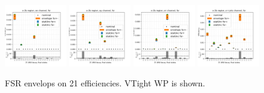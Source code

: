 \begin{figure}
    \includegraphics[width=0.24\textwidth]{chapters/Appendix/sectionTTSyst/figures/afterCorr/icata3_ch0_fsr.png}
    \includegraphics[width=0.24\textwidth]{chapters/Appendix/sectionTTSyst/figures/afterCorr/icata3_ch1_fsr.png}
    \includegraphics[width=0.24\textwidth]{chapters/Appendix/sectionTTSyst/figures/afterCorr/icata3_ch2_fsr.png}
    \includegraphics[width=0.24\textwidth]{chapters/Appendix/sectionTTSyst/figures/afterCorr/icata3_ch3_fsr.png}
    
    \caption{FSR envelops on 21 efficiencies. VTight WP is shown.}
    \label{fig:appendix:reweighttt:effAfterCorrFSR}
\end{figure}



